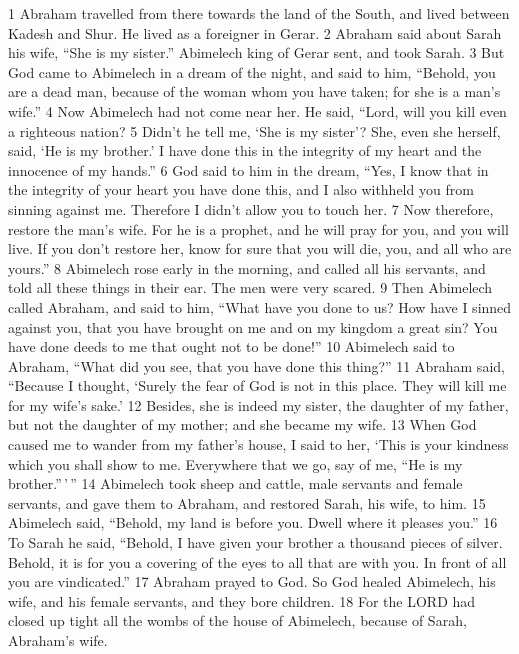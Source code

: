 {1} Abraham travelled from there towards the land of the South, and
lived between Kadesh and Shur. He lived as a foreigner in Gerar. {2}
Abraham said about Sarah his wife, ``She is my sister.'' Abimelech king
of Gerar sent, and took Sarah. {3} But God came to Abimelech in a dream
of the night, and said to him, ``Behold, you are a dead man, because of
the woman whom you have taken; for she is a man's wife.'' {4} Now
Abimelech had not come near her. He said, ``Lord, will you kill even a
righteous nation? {5} Didn't he tell me, `She is my sister'? She, even
she herself, said, `He is my brother.' I have done this in the integrity
of my heart and the innocence of my hands.'' {6} God said to him in the
dream, ``Yes, I know that in the integrity of your heart you have done
this, and I also withheld you from sinning against me. Therefore I
didn't allow you to touch her. {7} Now therefore, restore the man's
wife. For he is a prophet, and he will pray for you, and you will live.
If you don't restore her, know for sure that you will die, you, and all
who are yours.'' {8} Abimelech rose early in the morning, and called all
his servants, and told all these things in their ear. The men were very
scared. {9} Then Abimelech called Abraham, and said to him, ``What have
you done to us? How have I sinned against you, that you have brought on
me and on my kingdom a great sin? You have done deeds to me that ought
not to be done!'' {10} Abimelech said to Abraham, ``What did you see,
that you have done this thing?'' {11} Abraham said, ``Because I thought,
`Surely the fear of God is not in this place. They will kill me for my
wife's sake.' {12} Besides, she is indeed my sister, the daughter of my
father, but not the daughter of my mother; and she became my wife. {13}
When God caused me to wander from my father's house, I said to her,
`This is your kindness which you shall show to me. Everywhere that we
go, say of me, ``He is my brother.''\,'\,'' {14} Abimelech took sheep
and cattle, male servants and female servants, and gave them to Abraham,
and restored Sarah, his wife, to him. {15} Abimelech said, ``Behold, my
land is before you. Dwell where it pleases you.'' {16} To Sarah he said,
``Behold, I have given your brother a thousand pieces of silver. Behold,
it is for you a covering of the eyes to all that are with you. In front
of all you are vindicated.'' {17} Abraham prayed to God. So God healed
Abimelech, his wife, and his female servants, and they bore children.
{18} For the LORD had closed up tight all the wombs of the house of
Abimelech, because of Sarah, Abraham's wife.

